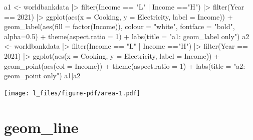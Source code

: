 \documentclass[
  letterpaper,
  DIV=11,
  numbers=noendperiod]{scrreprt}
\newenvironment{Shaded}{\begin{snugshade}}{\end{snugshade}}
\newcommand{\AttributeTok}[1]{\textcolor[rgb]{0.40,0.45,0.13}{#1}}
\newcommand{\DecValTok}[1]{\textcolor[rgb]{0.68,0.00,0.00}{#1}}
\newcommand{\FloatTok}[1]{\textcolor[rgb]{0.68,0.00,0.00}{#1}}
\newcommand{\FunctionTok}[1]{\textcolor[rgb]{0.28,0.35,0.67}{#1}}
\newcommand{\NormalTok}[1]{\textcolor[rgb]{0.00,0.23,0.31}{#1}}
\newcommand{\OtherTok}[1]{\textcolor[rgb]{0.00,0.23,0.31}{#1}}
\newcommand{\SpecialCharTok}[1]{\textcolor[rgb]{0.37,0.37,0.37}{#1}}
\newcommand{\StringTok}[1]{\textcolor[rgb]{0.13,0.47,0.30}{#1}}
\begin{document}
\begin{Shaded}
\begin{Highlighting}[]
\NormalTok{a1 }\OtherTok{\textless{}{-}}\NormalTok{ worldbankdata }\SpecialCharTok{|\textgreater{}}
  \FunctionTok{filter}\NormalTok{(Income }\SpecialCharTok{==} \StringTok{"L"} \SpecialCharTok{|}\NormalTok{ Income }\SpecialCharTok{==}\StringTok{"H"}\NormalTok{) }\SpecialCharTok{|\textgreater{}} 
  \FunctionTok{filter}\NormalTok{(Year }\SpecialCharTok{==} \DecValTok{2021}\NormalTok{) }\SpecialCharTok{|\textgreater{}}
  \FunctionTok{ggplot}\NormalTok{(}\FunctionTok{aes}\NormalTok{(}\AttributeTok{x =}\NormalTok{ Cooking, }\AttributeTok{y =}\NormalTok{ Electricity, }\AttributeTok{label =}\NormalTok{ Income)) }\SpecialCharTok{+} 
  \FunctionTok{geom\_label}\NormalTok{(}\FunctionTok{aes}\NormalTok{(}\AttributeTok{fill =} \FunctionTok{factor}\NormalTok{(Income)), }\AttributeTok{colour =} \StringTok{"white"}\NormalTok{, }\AttributeTok{fontface =} \StringTok{"bold"}\NormalTok{, }\AttributeTok{alpha=}\FloatTok{0.5}\NormalTok{) }\SpecialCharTok{+} \FunctionTok{theme}\NormalTok{(}\AttributeTok{aspect.ratio =} \DecValTok{1}\NormalTok{) }\SpecialCharTok{+} \FunctionTok{labs}\NormalTok{(}\AttributeTok{title =} \StringTok{"a1: geom\_label only"}\NormalTok{) }
\NormalTok{a2 }\OtherTok{\textless{}{-}}\NormalTok{ worldbankdata }\SpecialCharTok{|\textgreater{}}
  \FunctionTok{filter}\NormalTok{(Income }\SpecialCharTok{==} \StringTok{"L"} \SpecialCharTok{|}\NormalTok{ Income }\SpecialCharTok{==}\StringTok{"H"}\NormalTok{) }\SpecialCharTok{|\textgreater{}} 
  \FunctionTok{filter}\NormalTok{(Year }\SpecialCharTok{==} \DecValTok{2021}\NormalTok{) }\SpecialCharTok{|\textgreater{}}
  \FunctionTok{ggplot}\NormalTok{(}\FunctionTok{aes}\NormalTok{(}\AttributeTok{x =}\NormalTok{ Cooking, }\AttributeTok{y =}\NormalTok{ Electricity, }\AttributeTok{label =}\NormalTok{ Income)) }\SpecialCharTok{+} 
  \FunctionTok{geom\_point}\NormalTok{(}\FunctionTok{aes}\NormalTok{(}\AttributeTok{col =}\NormalTok{ Income)) }\SpecialCharTok{+}  \FunctionTok{theme}\NormalTok{(}\AttributeTok{aspect.ratio =} \DecValTok{1}\NormalTok{) }\SpecialCharTok{+} 
  \FunctionTok{labs}\NormalTok{(}\AttributeTok{title =} \StringTok{"a2: geom\_point only"}\NormalTok{) }
\NormalTok{a1}\SpecialCharTok{|}\NormalTok{a2}
\end{Highlighting}
\end{Shaded}

\texttt{[image: l\_files/figure-pdf/area-1.pdf]}

\section{geom\_line}\label{line}
\end{document}
